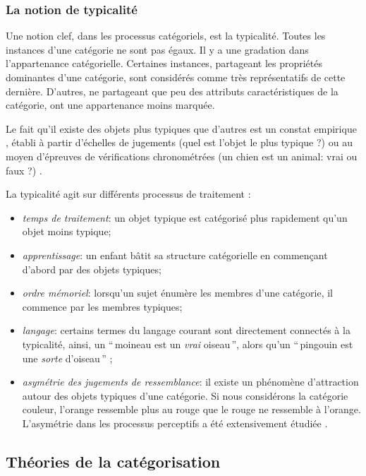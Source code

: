 \subsubsection{La notion de typicalité}
\label{sec:ch3_typicité}

Une notion clef, dans les processus catégoriels, est la typicalité. Toutes les instances d'une catégorie ne sont pas égaux. Il y a une gradation dans l'appartenance catégorielle. Certaines instances, partageant les propriétés dominantes d'une catégorie, sont considérés comme très représentatifs de cette dernière. D'autres, ne partageant que peu des attributs caractéristiques de la catégorie, ont une appartenance moins marquée.

Le fait qu'il existe des objets plus typiques que d'autres est un constat empirique \citep[p. 37]{rosch1978cognition,mervis1981categorization}, établi à partir d'échelles de jugements (quel est l'objet le plus typique ?) ou au moyen d'épreuves de vérifications chronométrées (un chien est un animal: vrai ou faux ?) \citep[p. 41]{dubois1991semantique}.

La typicalité agit sur différents processus de traitement \citep[p. 51]{Houix03f,mervis1981categorization}:

\begin{itemize}
\item \emph{temps de traitement}: un objet typique est catégorisé plus rapidement qu'un objet moins typique;
\item \emph{apprentissage}: un enfant bâtit sa structure catégorielle en commençant d'abord par des objets typiques;
\item \emph{ordre mémoriel}: lorsqu'un sujet énumère les membres d'une catégorie, il commence par les membres typiques;
\item \emph{langage}: certains termes du langage courant sont directement connectés à la typicalité, ainsi, un ``\,moineau est un \emph{vrai} oiseau\,'', alors qu'un ``\,pingouin est une \emph{sorte} d'oiseau\,'' \citep{mervis1981categorization};
\item \emph{asymétrie des jugements de ressemblance}: il existe un phénomène d'attraction autour des objets typiques d'une catégorie. Si nous considérons la catégorie couleur, l’orange ressemble plus au rouge que le rouge ne ressemble à l'orange. L'asymétrie dans les processus perceptifs a été extensivement étudiée \citep{tversky1977features,krumhansl1978concerning}.
\end{itemize}

\subsection{Théories de la catégorisation}
\label{sec:ch3_categoTheo}

